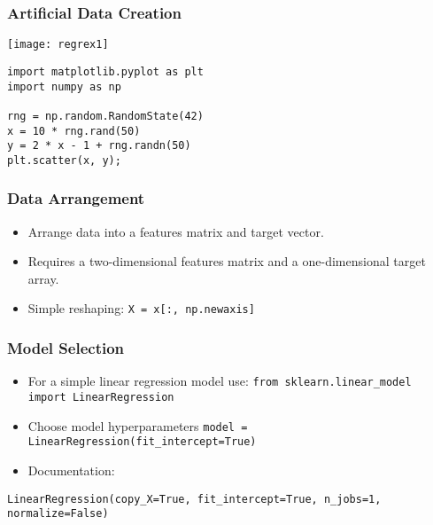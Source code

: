 \begin{frame}[fragile]\frametitle{Artificial Data Creation}

\begin{center}
\texttt{[image: regrex1]}
\end{center}

\begin{lstlisting}
import matplotlib.pyplot as plt
import numpy as np

rng = np.random.RandomState(42)
x = 10 * rng.rand(50)
y = 2 * x - 1 + rng.randn(50)
plt.scatter(x, y);
\end{lstlisting}

\end{frame}



\begin{frame}[fragile]\frametitle{Data Arrangement}
\begin{itemize}
\item Arrange data into a features matrix and target vector.
\item Requires a two-dimensional features matrix and a one-dimensional target array.
\item Simple reshaping: \lstinline|X = x[:, np.newaxis]|
\end{itemize}
\end{frame}

\begin{frame}[fragile]\frametitle{Model Selection}
\begin{itemize}
\item For a simple linear regression model use: \lstinline|from sklearn.linear_model import LinearRegression|
\item Choose model hyperparameters \lstinline|model = LinearRegression(fit_intercept=True)|
\item Documentation:

\end{itemize}

\begin{lstlisting}
LinearRegression(copy_X=True, fit_intercept=True, n_jobs=1, normalize=False)
\end{lstlisting}
\end{frame}

